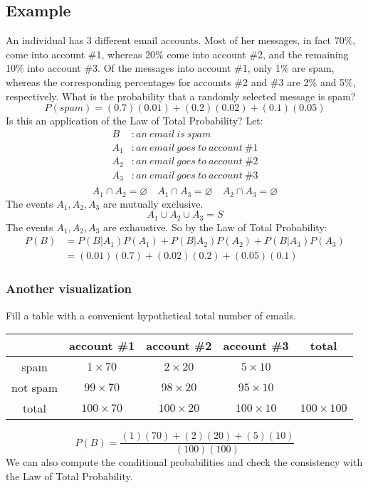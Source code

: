 \documentclass[letterpaper, 12pt]{math}
\begin{document}
\subsection*{Example}
An individual has 3 different email accounts. Most of her messages, in fact
70\%, come into account \#1, whereas 20\% come into account \#2, and the
remaining 10\% into account \#3. Of the messages into account \#1, only 1\% are
spam, whereas the corresponding percentages for accounts \#2 and \#3 are 2\%
and 5\%, respectively. What is the probability that a randomly selected message
is spam?
\[ P(spam) = (0.7)(0.01)+(0.2)(0.02)+(0.1)(0.05) \]
Is this an application of the Law of Total Probability? Let:
\begin{align*}
  B&: an\ email\ is\ spam \\
  A_{1}&: an\ email\ goes\ to\ account\ \#1 \\
  A_{2}&: an\ email\ goes\ to\ account\ \#2 \\
  A_{3}&: an\ email\ goes\ to\ account\ \#3 \\
\end{align*}
\[ A_{1} \cap A_{2} = \varnothing \quad A_{1} \cap A_{3} = \varnothing \quad
   A_{2} \cap A_{3} = \varnothing \]
The events \( A_{1}, A_{2}, A_{3} \) are mutually exclusive.
\[ A_{1} \cup A_{2} \cup A_{3} = S \]
The events \( A_{1}, A_{2}, A_{3} \) are exhaustive. So by the Law of Total
Probability:
\begin{align*}
  P(B) &= P(B|A_{1})P(A_{1})+P(B|A_{2})P(A_{2})+P(B|A_{3})P(A_{3}) \\
  &= (0.01)(0.7)+(0.02)(0.2)+(0.05)(0.1)
\end{align*}

\subsubsection*{Another visualization}
Fill a table with a convenient hypothetical total number of emails.
\begin{center}
  \begin{tabular}{|c|c|c|c|c|}
    \hline
    & account \#1 & account \#2 & account \#3 & total \\ \hline
    spam & \( 1 \times 70 \) & \( 2 \times 20 \) & \( 5 \times 10 \) & \\ \hline
    not spam & \( 99 \times 70 \) & \( 98 \times 20 \) & \( 95 \times 10 \) & \\
      \hline
    total & \( 100 \times 70 \) & \( 100 \times 20 \) & \( 100 \times 10 \) &
      \( 100 \times 100 \) \\ \hline
  \end{tabular}
\end{center}
\[ P(B) = \frac{(1)(70)+(2)(20)+(5)(10)}{(100)(100)} \]
We can also compute the conditional probabilities and check the consistency
with the Law of Total Probability.
\end{document}
